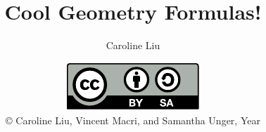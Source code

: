 


\usepackage{tikz}
\usepackage{tkz-euclide}
\usepackage{siunitx}


\title{Cool Geometry Formulas!}
\author{Caroline Liu}
\date{\includegraphics{../LicenseLogo}\\\copyright{} Caroline Liu, Vincent Macri, and Samantha Unger, Year}


	\frame{\titlepage}
	
	

